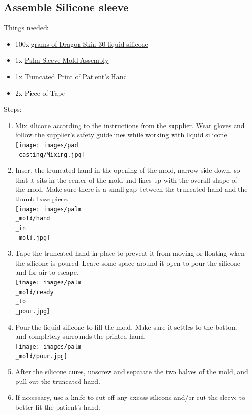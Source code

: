 \documentclass[11pt]{article}
\begin{document}
\subsection{Assemble Silicone sleeve}
Things needed:
\begin{itemize}
\item 100x \hyperlink{thing_g\_dragon\_skin\_30}{grams of Dragon Skin 30 liquid silicone}
\item 1x \hyperlink{thing_mold\_assembly}{Palm Sleeve Mold Assembly}
\item 1x \hyperlink{thing_truncated\_hand}{Truncated Print of Patient's Hand}
\item 2x Piece of Tape
\end{itemize}
Steps:
\begin{enumerate}
\item Mix silicone according to the instructions from the supplier. Wear gloves and follow the supplier's safety guidelines while working with liquid silicone.\\ \texttt{[image: images/pad\\\_casting/Mixing.jpg]}
\item Insert the truncated hand in the opening of the mold, narrow side down, so that it sits in the center of the mold and lines up with the overall shape of the mold. Make sure there is a small gap between the truncated hand and the thumb base piece.\\ \texttt{[image: images/palm\\\_mold/hand\\\_in\\\_mold.jpg]}
\item Tape the truncated hand in place to prevent it from moving or floating when the silicone is poured. Leave some space around it open to pour the silicone and for air to escape.\\ \texttt{[image: images/palm\\\_mold/ready\\\_to\\\_pour.jpg]}
\item Pour the liquid silicone to fill the mold. Make sure it settles to the bottom and completely surrounds the printed hand.\\ \texttt{[image: images/palm\\\_mold/pour.jpg]}
\item After the silicone cures, unscrew and separate the two halves of the mold, and pull out the truncated hand.
\item If necessary, use a knife to cut off any excess silicone and/or cut the sleeve to better fit the patient's hand.
\end{enumerate}
\end{document}
